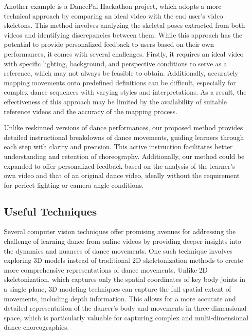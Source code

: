 Another example is a DancePal Hackathon project, which adopts a more technical approach by 
comparing an ideal video with the end user's video skeletons. \cite{Authors14c} This method involves analyzing the 
skeletal poses extracted from both videos and identifying discrepancies between them. While this 
approach has the potential to provide personalized feedback to users based on their own performances, 
it comes with several challenges. Firstly, it requires an ideal video with specific lighting, 
background, and perspective conditions to serve as a reference, which may not always be feasible 
to obtain. Additionally, accurately mapping movements onto predefined definitions can be difficult, 
especially for complex dance sequences with varying styles and interpretations. As a result, the 
effectiveness of this approach may be limited by the availability of suitable reference videos and 
the accuracy of the mapping process.

Unlike reskinned versions of dance performances, our proposed method provides detailed instructional 
breakdowns of dance movements, guiding learners through each step with clarity and precision. This 
active instruction facilitates better understanding and retention of choreography. Additionally, our 
method could be expanded to offer personalized feedback based on the analysis of the learner's own 
video and that of an original dance video, ideally without the requirement for perfect lighting or 
camera angle conditions.


\subsection{Useful Techniques}
Several computer vision techniques offer promising avenues for addressing the challenge of learning 
dance from online videos by providing deeper insights into the dynamics and nuances of dance 
movements. One such technique involves exploring 3D models instead of traditional 2D skeletonization
 methods to create more comprehensive representations of dance movements. Unlike 2D skeletonization, 
 which captures only the spatial coordinates of key body joints in a single plane, 3D modeling 
 techniques can capture the full spatial extent of movements, including depth information. \cite{Alpher03}This 
 allows for a more accurate and detailed representation of the dancer's body and movements in 
 three-dimensional space, which is particularly valuable for capturing complex and multi-dimensional 
 dance choreographies.


